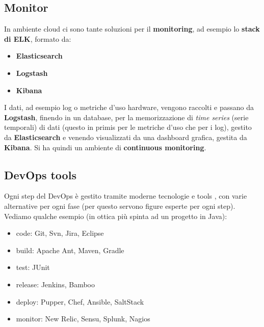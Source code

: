 \documentclass[a4paper,12pt, oneside]{book}
\begin{document}
\subsection{Monitor}
In ambiente cloud ci sono tante soluzioni per il \textbf{monitoring}, ad esempio
lo \textbf{stack di ELK}, formato da:
\begin{itemize}
  \item \textbf{Elasticsearch}
  \item \textbf{Logstash}
  \item \textbf{Kibana}
\end{itemize}
I dati, ad esempio log o metriche d'uso hardware, vengono raccolti e passano da
\textbf{Logstash}, finendo in un database, per la memorizzazione di \textit{time
series} (serie temporali) di dati (questo in primis per le metriche d'uso che
per i log), gestito da \textbf{Elasticsearch} e venendo visualizzati da una
dashboard grafica, gestita da \textbf{Kibana}. Si ha quindi un ambiente di
\textbf{continuous monitoring}.
\subsection{DevOps tools}
Ogni step del DevOps è gestito tramite moderne tecnologie e tools , con varie
alternative per ogni fase (per questo servono figure 
esperte per ogni step). Vediamo qualche esempio (in ottica più spinta ad un
progetto in Java):
\begin{itemize}
  \item code: Git, Svn, Jira, Eclipse
  \item build: Apache Ant, Maven, Gradle
  \item test: JUnit
  \item release: Jenkins, Bamboo
  \item deploy: Pupper, Chef, Ansible, SaltStack
  \item monitor: New Relic, Sensu, Splunk, Nagios
\end{itemize}
\end{document}
